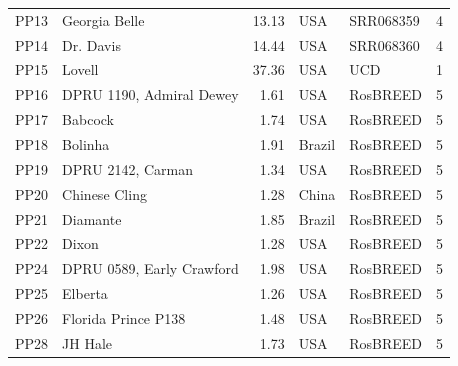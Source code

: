 \documentclass[12pt]{article}
\begin{document}
\begin{center}
\begin{longtable}{llrllc}
	PP13 &Georgia Belle &13.13 &USA &SRR068359 &4\\
	PP14 &Dr. Davis &14.44 &USA &SRR068360 &4\\
	PP15 &Lovell &37.36 &USA &UCD &1\\
	PP16 &DPRU 1190, Admiral Dewey &1.61 &USA &RosBREED &5\\
	PP17 &Babcock &1.74 &USA &RosBREED &5\\
	PP18 &Bolinha &1.91 &Brazil &RosBREED &5\\
	PP19 &DPRU 2142, Carman &1.34 &USA &RosBREED &5\\
	PP20 &Chinese Cling &1.28 &China &RosBREED &5\\
	PP21 &Diamante &1.85 &Brazil &RosBREED &5\\
	PP22 &Dixon &1.28 &USA &RosBREED &5\\
	PP24 &DPRU 0589, Early Crawford &1.98 &USA &RosBREED &5\\
	PP25 &Elberta &1.26 &USA &RosBREED &5\\
	PP26 &Florida Prince P138 &1.48 &USA &RosBREED &5\\
	PP28 &JH Hale &1.73 &USA &RosBREED &5\\

\end{longtable}
\end{center}
\end{document}
